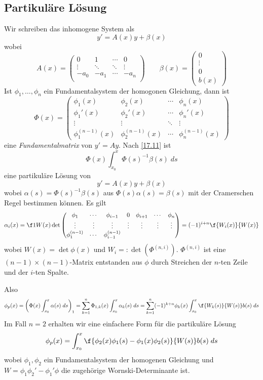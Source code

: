 \documentclass{mycourse}
\begin{document}
\subsection{Partikuläre Lösung}

Wir schreiben das inhomogene System als
\[
	y' = A(x)y + \beta(x)
\]
wobei
\[
	A(x) = \begin{pmatrix}
		0 & 1 & \cdots & 0 \\
		\vdots & \ddots & \ddots & \vdots \\
		-a_0 & -a_1 & \cdots & -a_n\\
	\end{pmatrix} \qquad \beta(x) = \begin{pmatrix} 0\\\vdots \\ 0\\ b(x)\end{pmatrix}
\]
Ist $\phi_1,\dotsc, \phi_n$ ein Fundamentalsystem der homogonen Gleichung, dann ist
			\[
				\Phi(x) = \begin{pmatrix}\phi_1(x) & \phi_2(x) & \cdots & \phi_n(x)\\
				\phi_1'(x) & \phi_2'(x) & \cdots & \phi_n'(x)\\
				\vdots & \vdots & \ddots & \vdots\\
				\phi_1^{(n-1)}(x) & \phi_2^{(n-1)}(x) & \cdots & \phi_n^{(n-1)}(x)
				\end{pmatrix}
			\]
eine \emph{Fundamentalmatrix} von $y'=Ay$.
Nach \ref{17.11} ist
\[
	\Phi(x) \int_{x_0}^x \Phi(s)^{-1}\beta(s) \; ds
\]
eine partikuläre Lösung von
\[
	y' = A(x)y + \beta(x)
\]
wobei $\alpha(s) = \Phi(s)^{-1}\beta(s)$ aus $\Phi(s)\alpha(s) = \beta(s)$ mit der Cramerschen Regel bestimmen können.
Es gilt
\[
	\alpha_i(x) = \f 1{W(x)} \det \begin{pmatrix} 
		\phi_1 & \cdots & \phi_{i-1} & 0 & \phi_{i+1} & \cdots & \phi_n\\
		\vdots & \vdots & \vdots & \vdots & \vdots & \vdots & \vdots\\
		\phi_1^{(n-1)} & \cdots & \phi_{i-1}^{(n-1)}
	\end{pmatrix}
	= (-1)^{i+n}\f{W_i(x)}{W(x)}
\]
wobei $W(x) = \det \phi(x)$ und $W_i =: \det (\Phi^{(n,i)})$.
$\Phi^{(n,i)}$ ist eine $(n-1)\times(n-1)$-Matrix entstanden aus $\phi$ durch Streichen der $n$-ten Zeile und der $i$-ten Spalte.

Also
\[
	\phi_p(x) = \left(\Phi(x) \int_{x_0}^x \alpha(s) \; ds\right)_1 = \sum_{k=1}^n \Phi_{1,k}(x) \int_{x_0}^x \alpha_k(s) \; ds = \sum_{k=1}^n (-1)^{k+n}\phi_k(x) \int_{x_0}^x \f{W_k(s)}{W(s)}b(s) \; ds
\]
Im Fall $n=2$ erhalten wir eine einfachere Form für die partikuläre Lösung
\[
	\phi_p(x) = \int_{x_0}^x \f{\phi_2(x)\phi_1(s) - \phi_1(x) \phi_2(s)}{W(s)}b(s) \; ds
\]
wobei $\phi_1,\phi_2$ ein Fundamentalsystem der homogenen Gleichung und $W=\phi_1\phi_2' - \phi_1'\phi$ die zugehörige Wornski-Determinante ist.
\end{document}
